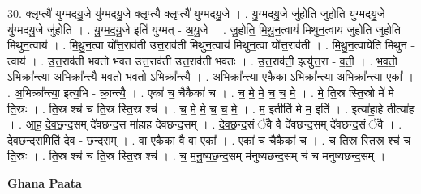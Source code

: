 \documentclass[17pt]{extarticle}
\begin{document}
30. क्लृप्त्यै॑ युग्मदयु॒जे यु॑ग्मदयु॒जे क्लृप्त्यै॒ क्लृप्त्यै॑ युग्मदयु॒जे । . यु॒ग्म॒द॒यु॒जे जु॑होति जुहोति युग्मदयु॒जे यु॑ग्मदयु॒जे जु॑होति । . यु॒ग्म॒द॒यु॒जे इति॑ युग्मत् - अ॒यु॒जे । . जु॒हो॒ति॒ मि॒थु॒न॒त्वाय॑ मिथुन॒त्वाय॑ जुहोति जुहोति मिथुन॒त्वाय॑ । . मि॒थु॒न॒त्वा यो᳚त्त॒राव॑ती उत्त॒राव॑ती मिथुन॒त्वाय॑ मिथुन॒त्वा यो᳚त्त॒राव॑ती । . मि॒थु॒न॒त्वायेति॑ मिथुन - त्वाय॑ । . उ॒त्त॒राव॑ती भवतो भवत उत्त॒राव॑ती उत्त॒राव॑ती भवतः । . उ॒त्त॒राव॑ती॒ इत्यु॑त्त॒रा - व॒ती॒ । . भ॒व॒तो॒ ऽभिक्रा᳚न्त्या अ॒भिक्रा᳚न्त्यै भवतो भवतो॒ ऽभिक्रा᳚न्त्यै । . अ॒भिक्रा᳚न्त्या॒ एकैका॒ ऽभिक्रा᳚न्त्या अ॒भिक्रा᳚न्त्या॒ एका᳚ । . अ॒भिक्रा᳚न्त्या॒ इत्य॒भि - क्रा॒न्त्यै॒ । . एका॑ च॒ चैकैका॑ च । . च॒ मे॒ मे॒ च॒ च॒ मे॒ । . मे॒ ति॒स्र स्ति॒स्रो मे॑ मे ति॒स्रः । . ति॒स्र श्च॑ च ति॒स्र स्ति॒स्र श्च॑ । . च॒ मे॒ मे॒ च॒ च॒ मे॒ । . म॒ इतीति॑ मे म॒ इति॑ । . इत्या॑हा॒हे तीत्या॑ह । . आ॒ह॒ दे॒व॒छ॒न्द॒सम् दे॑वछन्द॒स मा॑हाह देवछन्द॒सम् । . दे॒व॒छ॒न्द॒सं ॅवै वै दे॑वछन्द॒सम् दे॑वछन्द॒सं ॅवै । . दे॒व॒छ॒न्द॒समिति॑ देव - छ॒न्द॒सम् । . वा एकैका॒ वै वा एका᳚ । . एका॑ च॒ चैकैका॑ च । . च॒ ति॒स्र स्ति॒स्र श्च॑ च ति॒स्रः । . ति॒स्र श्च॑ च ति॒स्र स्ति॒स्र श्च॑ । . च॒ म॒नु॒ष्य॒छ॒न्द॒सम् म॑नुष्यछन्द॒सम् च॑ च मनुष्यछन्द॒सम् । \newline

\textbf{Ghana Paata } \newline
\end{document}
